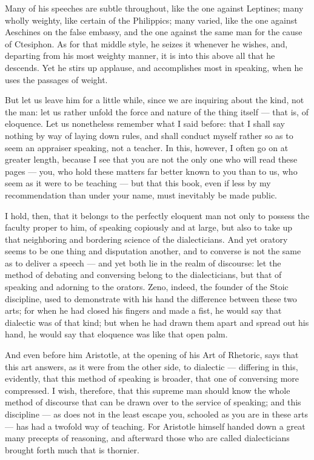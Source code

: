  Many of his speeches are subtle throughout, like the one against Leptines; many wholly weighty, like certain of the Philippics; many varied, like the one against Aeschines on the false embassy, and the one against the same man for the cause of Ctesiphon. As for that middle style, he seizes it whenever he wishes, and, departing from his most weighty manner, it is into this above all that he descends. Yet he stirs up applause, and accomplishes most in speaking, when he uses the passages of weight.

 But let us leave him for a little while, since we are inquiring about the kind, not the man: let us rather unfold the force and nature of the thing itself — that is, of eloquence. Let us nonetheless remember what I said before: that I shall say nothing by way of laying down rules, and shall conduct myself rather so as to seem an appraiser speaking, not a teacher. In this, however, I often go on at greater length, because I see that you are not the only one who will read these pages — you, who hold these matters far better known to you than to us, who seem as it were to be teaching — but that this book, even if less by my recommendation than under your name, must inevitably be made public.

 I hold, then, that it belongs to the perfectly eloquent man not only to possess the faculty proper to him, of speaking copiously and at large, but also to take up that neighboring and bordering science of the dialecticians. And yet oratory seems to be one thing and disputation another, and to converse is not the same as to deliver a speech — and yet both lie in the realm of discourse: let the method of debating and conversing belong to the dialecticians, but that of speaking and adorning to the orators. Zeno, indeed, the founder of the Stoic discipline, used to demonstrate with his hand the difference between these two arts; for when he had closed his fingers and made a fist, he would say that dialectic was of that kind; but when he had drawn them apart and spread out his hand, he would say that eloquence was like that open palm.

 And even before him Aristotle, at the opening of his Art of Rhetoric, says that this art answers, as it were from the other side, to dialectic — differing in this, evidently, that this method of speaking is broader, that one of conversing more compressed. I wish, therefore, that this supreme man should know the whole method of discourse that can be drawn over to the service of speaking; and this discipline — as does not in the least escape you, schooled as you are in these arts — has had a twofold way of teaching. For Aristotle himself handed down a great many precepts of reasoning, and afterward those who are called dialecticians brought forth much that is thornier.

